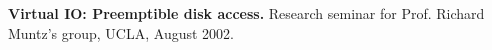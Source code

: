 \documentclass[10pt]{article}
\renewcommand{\section}[1]{ \vspace{10pt}\begin{flushleft}{\hspace{-0.2in }\Large\bf
    #1}\end{flushleft}\nopagebreak }
\begin{document}
\begin{thebibliography}{22.}
{\bf Virtual IO: Preemptible disk access.} Research seminar for Prof. Richard 
Muntz's group, UCLA, August 2002.





\end{thebibliography}






\end{document}

